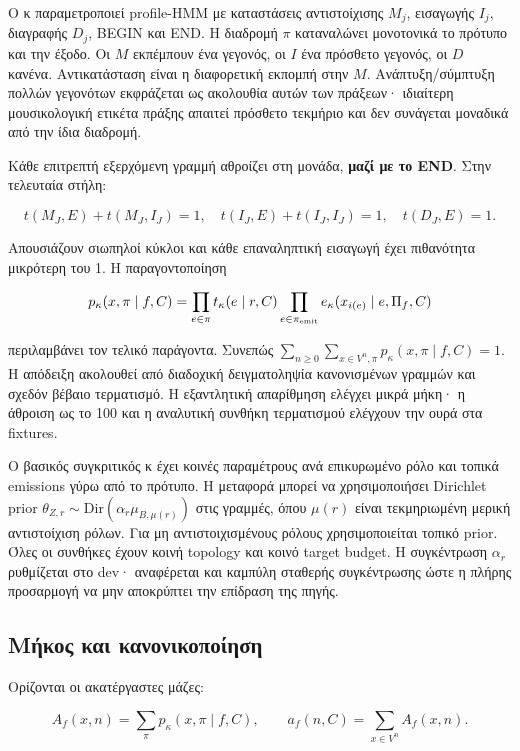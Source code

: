 \documentclass[
  10pt,
  a4paper,
]{report}
\begin{document}
Ο κ παραμετροποιεί profile-HMM με καταστάσεις αντιστοίχισης \(M_j\),
εισαγωγής \(I_j\), διαγραφής \(D_j\), BEGIN και END. Η διαδρομή \(\pi\)
καταναλώνει μονοτονικά το πρότυπο και την έξοδο. Οι \(M\) εκπέμπουν ένα
γεγονός, οι \(I\) ένα πρόσθετο γεγονός, οι \(D\) κανένα. Αντικατάσταση
είναι η διαφορετική εκπομπή στην \(M\). Ανάπτυξη/σύμπτυξη πολλών
γεγονότων εκφράζεται ως ακολουθία αυτών των πράξεων· ιδιαίτερη
μουσικολογική ετικέτα πράξης απαιτεί πρόσθετο τεκμήριο και δεν συνάγεται
μοναδικά από την ίδια διαδρομή.

Κάθε επιτρεπτή εξερχόμενη γραμμή αθροίζει στη μονάδα, \textbf{μαζί με το
END}. Στην τελευταία στήλη:

\[
t(M_J,E)+t(M_J,I_J)=1,\quad
t(I_J,E)+t(I_J,I_J)=1,\quad t(D_J,E)=1.
\]

Απουσιάζουν σιωπηλοί κύκλοι και κάθε επαναληπτική εισαγωγή έχει
πιθανότητα μικρότερη του 1. Η παραγοντοποίηση

\[
p_\kappa(x,\pi\mid f,C)=\prod_{e\in\pi}t_\kappa(e\mid r,C)\prod_{e\in\pi_{\rm emit}}e_\kappa(x_{i(e)}\mid e,\Pi_f,C)
\]

περιλαμβάνει τον τελικό παράγοντα. Συνεπώς
\(\sum_{n\ge0}\sum_{x\in V^n,\pi}p_\kappa(x,\pi\mid f,C)=1\). Η απόδειξη
ακολουθεί από διαδοχική δειγματοληψία κανονισμένων γραμμών και σχεδόν
βέβαιο τερματισμό. Η εξαντλητική απαρίθμηση ελέγχει μικρά μήκη· η
άθροιση ως το 100 και η αναλυτική συνθήκη τερματισμού ελέγχουν την ουρά
στα fixtures.

Ο βασικός συγκριτικός κ έχει κοινές παραμέτρους ανά επικυρωμένο ρόλο και
τοπικά emissions γύρω από το πρότυπο. Η μεταφορά μπορεί να
χρησιμοποιήσει Dirichlet prior
\(\theta_{Z,r}\sim\mathrm{Dir}(\alpha_r\mu_{B,\mu(r)})\) στις γραμμές,
όπου \(\mu(r)\) είναι τεκμηριωμένη μερική αντιστοίχιση ρόλων. Για μη
αντιστοιχισμένους ρόλους χρησιμοποιείται τοπικό prior. Όλες οι συνθήκες
έχουν κοινή topology και κοινό target budget. Η συγκέντρωση \(\alpha_r\)
ρυθμίζεται στο dev· αναφέρεται και καμπύλη σταθερής συγκέντρωσης ώστε η
πλήρης προσαρμογή να μην αποκρύπτει την επίδραση της πηγής.

\subsection{Μήκος και
κανονικοποίηση}\label{ux3bcux3aeux3baux3bfux3c2-ux3baux3b1ux3b9-ux3baux3b1ux3bdux3bfux3bdux3b9ux3baux3bfux3c0ux3bfux3afux3b7ux3c3ux3b7}

Ορίζονται οι ακατέργαστες μάζες:

\[
A_f(x,n)=\sum_\pi p_\kappa(x,\pi\mid f,C),\qquad
a_f(n,C)=\sum_{x\in V^n}A_f(x,n).
\]
\end{document}
